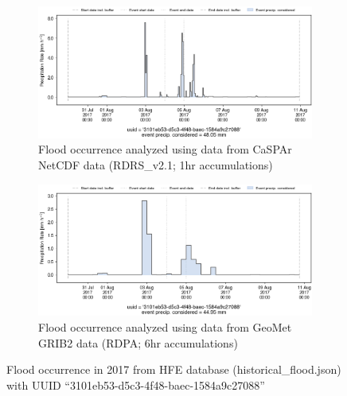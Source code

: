 \documentclass[10pt,a4paper,titlepage,parskip]{scrartcl}
\begin{document}
\begin{figure}[h]
	\begin{subfigure}[a]{1.0\textwidth}
		\centering
		\includegraphics[width=\linewidth]{figures/compare_Geomet_CaSPAr/interpolated_at_stations_occurrence_932_identified-timesteps_RDRS_v2.1.png}
		\caption{Flood occurrence analyzed using data from CaSPAr NetCDF data (RDRS\_v2.1; 1hr accumulations)}
	\end{subfigure}
	\par\bigskip\bigskip
	\begin{subfigure}[b]{1.0\textwidth}
		\centering
		\includegraphics[width=\linewidth]{figures/compare_Geomet_CaSPAr/interpolated_at_stations_occurrence_932_identified-timesteps_rdpa_10km_6f.png}
		\caption{Flood occurrence analyzed using data from GeoMet GRIB2 data (RDPA; 6hr accumulations)}
	\end{subfigure}
	\par\bigskip\bigskip
	\caption{Flood occurrence in 2017 from HFE database (historical\_flood.json) with UUID ``3101eb53-d5c3-4f48-baec-1584a9c27088''}
\end{figure}
\pagebreak
\end{document}
